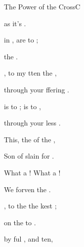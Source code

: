 \begin{song}{The Power of the Cross}{C}
\begin{SBVerse}
         as it's 
              .

          in , 
             are  to ;

         the  .

    \end{SBVerse}

    \begin{SBVerse}
        
        , to  my  
            tten  the , 

         through your ffering 
              .

         is  to ;
             is  to ,

         through your less .

    \end{SBVerse}

    \begin{SBChorus}

        This, the  of the ,

        Son of  slain for .

        What a ! What a !

        We  forven  the . 
            \Ch{[Am}{}  \Ch{C]}{}

    \end{SBChorus}

\begin{SBExtraKeys}{
    \CBPageBrk

    \Ch{Intro: [Em}{}  \Ch{G]x2}{}
    \begin{SBVerse}
        
        , to  the  
             the kest ; 

         on the  to 
            .

         by ful , 
             and ten, 


\end{SBVerse}}
\end{SBExtraKeys}
\end{song}
